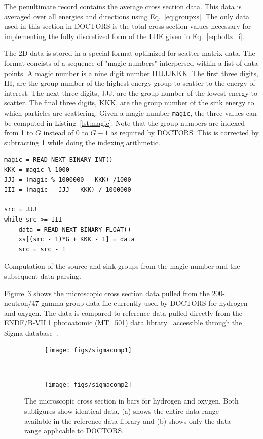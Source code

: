 The penultimate record contains the average cross section data. This data is averaged over all energies and directions using Eq.~\ref{eq:groupxs}. The only data used in this section in DOCTORS is the total cross section values necessary for implementing the fully discretized form of the LBE given in Eq.~\ref{eq:boltz_i}.

The 2D data is stored in a special format optimized for scatter matrix data. The format concists of a sequence of "magic numbers" interpersed within a list of data points. A magic number is a nine digit number IIIJJJKKK. The first three digits, III, are the group number of the highest energy group to scatter to the energy of interest. The next three digits, JJJ, are the group number of the lowest energy to scatter. The final three digits, KKK, are the group number of the sink energy to which particles are scattering. Given a magic number \texttt{magic}, the three values can be computed in Listing~\ref{lst:magic}. Note that the group numbers are indexed from 1 to $G$ instead of 0 to $G-1$ as required by DOCTORS. This is corrected by subtracting 1 while doing the indexing arithmetic.

\begin{listing}
\begin{verbatim}
magic = READ_NEXT_BINARY_INT()
KKK = magic % 1000
JJJ = (magic % 1000000 - KKK) /1000
III = (magic - JJJ - KKK) / 1000000

src = JJJ
while src >= III
	data = READ_NEXT_BINARY_FLOAT()
	xs[(src - 1)*G + KKK - 1] = data
	src = src - 1
\end{verbatim}
\caption{Computation of the source and sink groups from the magic number and the subsequent data parsing.}\label{lst:magic}
\end{listing}

Figure~\ref{fig:sigmacomp} shows the microscopic cross section data pulled from the 200-neutron/47-gamma group data file currently used by DOCTORS for hydrogen and oxygen. The data is compared to reference data pulled directly from the ENDF/B-VII.1 photoatomic (MT=501) data library~\citep{ref:cullend} accessible through the Sigma database~\citep{ref:sigma}.

\begin{figure}
    \centering
    \begin{subfigure}[b]{0.45\textwidth}
        \texttt{[image: figs/sigmacomp1]}
        \caption{}
        \label{fig:ampx1}
    \end{subfigure}
    ~
    \begin{subfigure}[b]{0.45\textwidth}
        \texttt{[image: figs/sigmacomp2]}
        \caption{}
        \label{fig:ampx2}
    \end{subfigure}
    \caption{The microscopic cross section in bars for hydrogen and oxygen. Both subfigures show identical data, (a) shows the entire data range available in the reference data library and (b) shows only the data range applicable to DOCTORS.}\label{fig:sigmacomp}
\end{figure}

